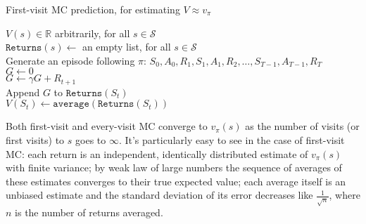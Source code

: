 \documentclass[12pt]{article}
\begin{document}
\begin{algorithm}[h]
  \caption{First-visit MC prediction, for estimating $V \approx v_\pi$}
  $V(s) \in \mathbb R$ arbitrarily, for all $s \in \mathcal S$ \\
  $\texttt{Returns}(s) \gets$ an empty list, for all $s \in \mathcal S$ \\
   {
    Generate an episode following $\pi$: $S_0, A_0, R_1, S_1, A_1, R_2,     \ldots,S_{T-1}, A_{T-1}, R_T$ \\
    $G\gets 0$ \\
     {
      $G \gets \gamma G + R_{t+1}$ \\
       {
        Append $G$ to $\texttt{Returns}(S_t)$ \\
        $V(S_t) \gets \texttt{average}(\texttt{Returns}(S_t))$
      }
    }
  }
\end{algorithm}

Both first-visit and every-visit MC converge to $v_\pi(s)$ as the number of visits (or first visits) to $s$ goes to $\infty$. It's particularly easy to see in the case of first-visit MC: each return is an independent, identically distributed estimate of $v_\pi(s)$ with finite variance; by weak law of large numbers the sequence of averages of these estimates converges to their true expected value; each average itself is an unbiased estimate and the standard deviation of its error decreases like $\frac{1}{\sqrt n}$, where $n$ is the number of returns averaged.
\end{document}
